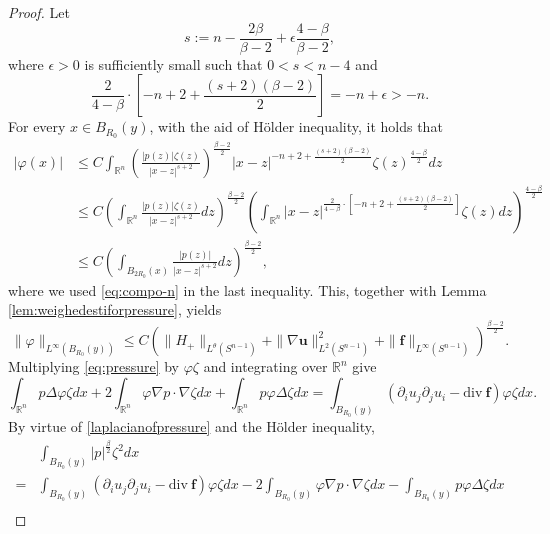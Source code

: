 \documentclass[12pt]{amsart}
\newcommand{\Bu}{{\boldsymbol{u}}}
\newcommand{\Bf}{{\boldsymbol{f}}}
\begin{document}
{\begin{proof}
		Let 
		\begin{equation*}
			s:= n- \frac{2\beta}{\beta-2} + \epsilon \frac{4-\beta}{\beta-2},
		\end{equation*}
		where $\epsilon>0$ is sufficiently small such that $0<s<n-4$ and 
		\begin{equation}\label{eq:compo-n}
			\frac{2}{4-\beta}\cdot\left[-n+2+\frac{(s+2)(\beta-2)}{2}\right] = -n+\epsilon >-n.
		\end{equation}
		For every $x\in B_{R_0}(y)$, with the aid of  H\"older inequality, it holds that 
		\begin{align*}
			|\varphi(x)| & \leq C\int_{\mathbb{R}^{n}}\left(\frac{|p(z)|\zeta(z)}{|x-z|^{s+2}}  \right)^{\frac{\beta-2}{2}}|x-z|^{-n+2+\frac{(s+2)(\beta-2)}{2}}\zeta(z)^{\frac{4-\beta}{2}}dz \\
			&\le C \left(\int_{\mathbb{R}^{n}}\frac{|p(z)|\zeta(z)}{|x-z|^{s+2}} dz \right)^{\frac{\beta-2}{2}}\left(\int_{\mathbb{R}^{n}}|x-z|^{\frac{2}{4-\beta}\cdot[-n+2+\frac{(s+2)(\beta-2)}{2}]}\zeta (z) dz\right)^{\frac{4-\beta}{2}} \\
			&\le C\left(\int_{B_{2R_0}(x)}\frac{|p(z)|}{|x-z|^{s+2}}dz\right)^{\frac{\beta-2}{2}},
		\end{align*}
		where we  used  \eqref{eq:compo-n} in the last inequality. This, together with Lemma \ref{lem:weighedestiforpressure},  yields
		\begin{equation}\label{Linfinityoftestfunction}
			\|\varphi\|_{L^{\infty}(B_{R_{0}}(y))}\leq C\left(\|H_{+}\|_{L^{\theta}(S^{n-1})}+	 \|\nabla \Bu\|_{L^{2}(S^{n-1})}^2+\|\Bf\|_{L^\infty(S^{n-1})}\right)^{\frac{\beta-2}{2}}.
		\end{equation}
		Multiplying \eqref{eq:pressure} by $\varphi\zeta$ and integrating over $\mathbb{R}^n$ give
		\begin{equation*}
			\int_{\mathbb{R}^{n}}p\Delta\varphi\zeta dx +2\int_{\mathbb{R}^{n}}\varphi\nabla p\cdot\nabla\zeta dx +\int_{\mathbb{R}^{n}}p\varphi\Delta\zeta dx =\int_{B_{R_0}(y)}(\partial_{i}u_{j}\partial_{j}u_{i}-\text{div}~\Bf)\varphi\zeta dx.         	    
		\end{equation*}	
		By virtue of \eqref{laplacianofpressure} and the H\"older inequality, 
		\begin{equation}\label{newestimateforpressure}
			\begin{aligned}
				&\int_{B_{R_0}(y)}|p|^{\frac{\beta}{2}}\zeta^{2} dx \\ =&\int_{B_{R_0}(y)}(\partial_{i}u_{j}\partial_{j}u_{i}-\text{div}~\Bf)\varphi\zeta dx -2\int_{B_{R_0}(y)}\varphi\nabla p\cdot\nabla\zeta dx -\int_{B_{R_0}(y)}p\varphi\Delta\zeta dx   \\

\end{aligned}
\end{equation}
\end{proof}}
\end{document}

